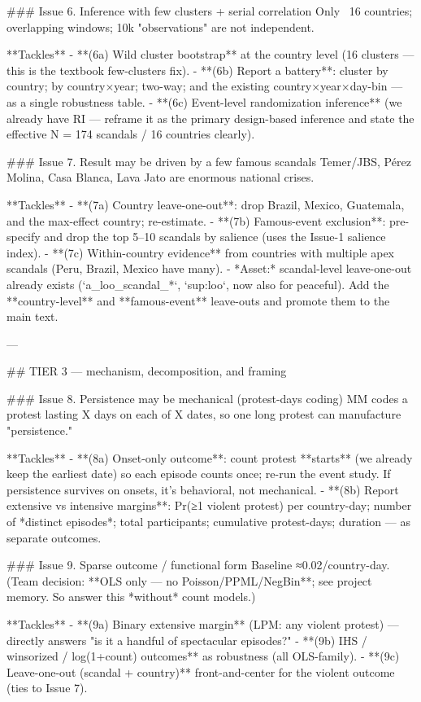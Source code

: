 ### Issue 6. Inference with few clusters + serial correlation
Only ~16 countries; overlapping windows; 10k "observations" are not independent.

**Tackles**
- **(6a) Wild cluster bootstrap** at the country level (16 clusters — this is the
  textbook few-clusters fix).
- **(6b) Report a battery**: cluster by country; by country×year; two-way; and
  the existing country×year×day-bin — as a single robustness table.
- **(6c) Event-level randomization inference** (we already have RI — reframe it as
  the primary design-based inference and state the effective N = 174 scandals /
  16 countries clearly).

### Issue 7. Result may be driven by a few famous scandals
Temer/JBS, Pérez Molina, Casa Blanca, Lava Jato are enormous national crises.

**Tackles**
- **(7a) Country leave-one-out**: drop Brazil, Mexico, Guatemala, and the
  max-effect country; re-estimate.
- **(7b) Famous-event exclusion**: pre-specify and drop the top 5–10 scandals by
  salience (uses the Issue-1 salience index).
- **(7c) Within-country evidence** from countries with multiple apex scandals
  (Peru, Brazil, Mexico have many).
- *Asset:* scandal-level leave-one-out already exists (`a_loo_scandal_*`,
  `sup:loo`, now also for peaceful). Add the **country-level** and
  **famous-event** leave-outs and promote them to the main text.

---

## TIER 3 — mechanism, decomposition, and framing

### Issue 8. Persistence may be mechanical (protest-days coding)
MM codes a protest lasting X days on each of X dates, so one long protest can
manufacture "persistence."

**Tackles**
- **(8a) Onset-only outcome**: count protest **starts** (we already keep the
  earliest date) so each episode counts once; re-run the event study. If
  persistence survives on onsets, it's behavioral, not mechanical.
- **(8b) Report extensive vs intensive margins**: Pr(≥1 violent protest) per
  country-day; number of *distinct episodes*; total participants; cumulative
  protest-days; duration — as separate outcomes.

### Issue 9. Sparse outcome / functional form
Baseline ≈0.02/country-day. (Team decision: **OLS only — no Poisson/PPML/NegBin**;
see project memory. So answer this *without* count models.)

**Tackles**
- **(9a) Binary extensive margin** (LPM: any violent protest) — directly answers
  "is it a handful of spectacular episodes?"
- **(9b) IHS / winsorized / log(1+count) outcomes** as robustness (all OLS-family).
- **(9c) Leave-one-out (scandal + country)** front-and-center for the violent
  outcome (ties to Issue 7).

